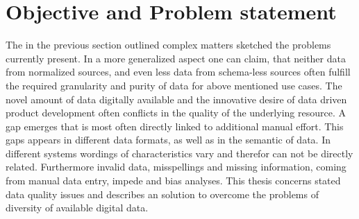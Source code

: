 \section{Objective and Problem statement\label{sec:objective}}
The in the previous section outlined complex matters sketched the problems currently present. In a more generalized aspect one can claim, that neither data from normalized sources, and even less data from schema-less sources often fulfill the required granularity and purity of data for above mentioned use cases. The novel amount of data digitally available and the innovative desire of data driven product development often conflicts in the quality of the underlying resource. A gap emerges that is most often directly linked to additional manual effort. This gaps appears in different data formats, as well as in the semantic of data. In different systems wordings of characteristics vary and therefor can not be directly related. Furthermore invalid data, misspellings and missing information, coming from manual data entry, impede and bias analyses. This thesis concerns stated data quality issues and describes an solution to overcome the problems of diversity of available digital data.

